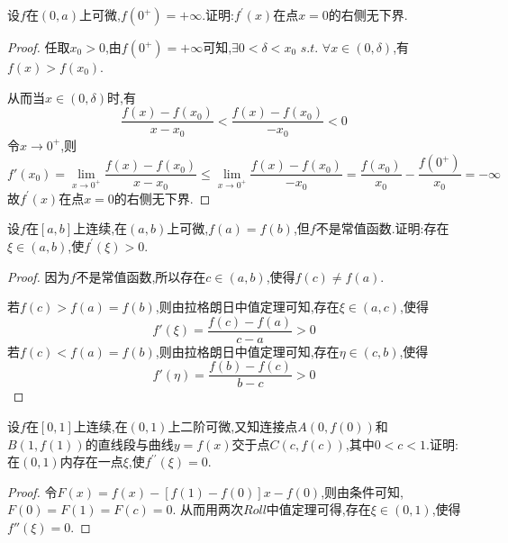 \documentclass[lang=cn,newtx,10pt,scheme=chinese]{elegantbook}
\begin{document}
\begin{exercise}
    设\(f\)在\((0,a)\)上可微,\(f(0^{+}) = +\infty\).证明:\(f^{\prime}(x)\)在点\(x = 0\)的右侧无下界.
    \begin{proof}
    任取$x_0>0$,由\(f(0^{+}) = +\infty\)可知,$\exists 0<\delta<x_0\,\,s.t.\,\,\forall x\in(0,\delta)$,有$f(x)>f(x_0)$.
    
    从而当$x\in(0,\delta)$时,有
    \begin{equation}
        \frac{f(x)-f(x_0)}{x-x_0}<\frac{f(x)-f(x_0)}{-x_0}<0
        \nonumber
    \end{equation}
    令$x\to0^{+}$,则
    \begin{equation}
        f'(x_0)=\underset{x\rightarrow 0^+}{\lim}\frac{f(x)-f(x_0)}{x-x_0}\leqslant \underset{x\rightarrow 0^+}{\lim}\frac{f(x)-f(x_0)}{-x_0}=\frac{f\left( x_0 \right)}{x_0}-\frac{f\left( 0^+ \right)}{x_0}=-\infty 
        \nonumber
    \end{equation}
    故\(f^{\prime}(x)\)在点\(x = 0\)的右侧无下界.
    \end{proof}
\end{exercise}

\begin{exercise}
    设\(f\)在\([a,b]\)上连续,在\((a,b)\)上可微,\(f(a)=f(b)\),但\(f\)不是常值函数.证明:存在\(\xi\in(a,b)\),使\(f^{\prime}(\xi)>0\).
    \begin{proof}
    因为\(f\)不是常值函数,所以存在$c\in(a,b)$,使得$f(c)\ne f(a)$.
    
    若$f(c)>f(a)=f(b)$,则由拉格朗日中值定理可知,存在$\xi\in(a,c)$,使得
    \begin{equation}
        f'\left( \xi \right) =\frac{f\left( c \right) -f\left( a \right)}{c-a}>0
        \nonumber
    \end{equation}
    若$f(c)<f(a)=f(b)$,则由拉格朗日中值定理可知,存在$\eta\in(c,b)$,使得
    \begin{equation}
        f'\left( \eta \right) =\frac{f\left( b \right) -f\left( c \right)}{b-c}>0
        \nonumber
    \end{equation}
    \end{proof}
\end{exercise}

\begin{exercise}
    设\(f\)在\([0,1]\)上连续,在\((0,1)\)上二阶可微,又知连接点\(A(0,f(0))\)和\(B(1,f(1))\)的直线段与曲线\(y = f(x)\)交于点\(C(c,f(c))\),其中\(0<c<1\).证明:在\((0,1)\)内存在一点\(\xi\),使\(f^{\prime\prime}(\xi)=0\).
    \begin{proof}
    令$F(x)=f(x)-[f(1)-f(0)]x-f(0)$,则由条件可知,$F(0)=F(1)=F(c)=0$.
    从而用两次$Roll$中值定理可得,存在$\xi\in(0,1)$,使得$f''(\xi)=0$.
    \end{proof}
\end{exercise}
\end{document}
